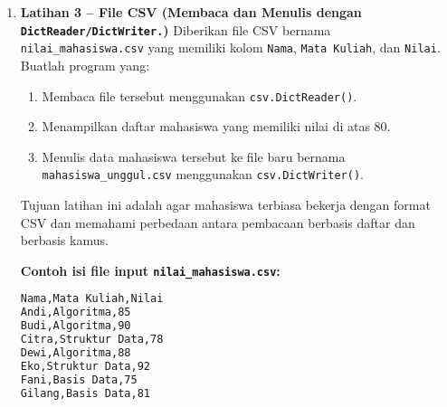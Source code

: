 \begin{enumerate}
\noindent\textbf{Contoh isi file input \texttt{log\_aktivitas.txt}:}

\begin{lstlisting}[language=bash, caption={Cuplikan isi file log_aktivitas.txt}]
[08:45] Starting system check...
[09:00] User login successful
[09:15] Loading configuration file
[09:30] ERROR: Missing configuration file
[10:00] Backup completed
[10:30] Process failed to execute script
[11:00] ERROR: Disk read failure
[11:15] Update finished successfully
[11:45] ERROR: Connection timeout
\end{lstlisting}

\noindent\textbf{Contoh hasil file output \texttt{ringkasan\_error.txt}:}

\begin{lstlisting}[language=bash, caption={Isi file ringkasan_error.txt yang dihasilkan}]
Baris yang mengandung kata "error" atau "failed":

[09:30] ERROR: Missing configuration file
[10:30] Process failed to execute script
[11:00] ERROR: Disk read failure
[11:45] ERROR: Connection timeout

Total kemunculan kata kunci: 4
\end{lstlisting}

\item \textbf{Latihan 3 – File CSV (Membaca dan Menulis dengan \texttt{DictReader/DictWriter.})}  
Diberikan file CSV bernama \texttt{nilai\_mahasiswa.csv} yang memiliki kolom \texttt{Nama}, \texttt{Mata Kuliah}, dan \texttt{Nilai}.  
Buatlah program yang:
\begin{enumerate}
    \item Membaca file tersebut menggunakan \texttt{csv.DictReader()}.  
    \item Menampilkan daftar mahasiswa yang memiliki nilai di atas 80.  
    \item Menulis data mahasiswa tersebut ke file baru bernama \texttt{mahasiswa\_unggul.csv} menggunakan \texttt{csv.DictWriter()}.  
\end{enumerate}

Tujuan latihan ini adalah agar mahasiswa terbiasa bekerja dengan format CSV dan memahami perbedaan antara pembacaan berbasis daftar dan berbasis kamus.

\noindent\textbf{Contoh isi file input \texttt{nilai\_mahasiswa.csv}:}

\begin{lstlisting}[language=bash, caption={Cuplikan isi file nilai_mahasiswa.csv}]
Nama,Mata Kuliah,Nilai
Andi,Algoritma,85
Budi,Algoritma,90
Citra,Struktur Data,78
Dewi,Algoritma,88
Eko,Struktur Data,92
Fani,Basis Data,75
Gilang,Basis Data,81
\end{lstlisting}


\end{enumerate}
